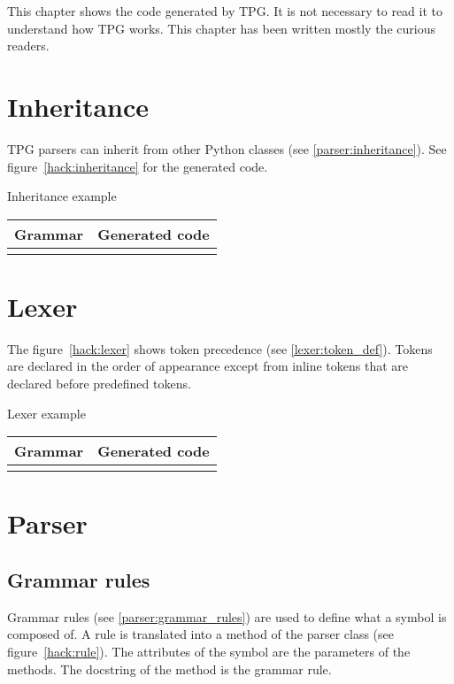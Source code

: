 
\newcommand{\hack}[3]
{
	\begin{tableau}
	\caption{#2} \label{#3}
	\begin{tabular}{| p{6cm} | p{8cm} | }
	\hline
		Grammar & Generated code \\
	\hline
	\hline
		{ \scriptsize \verbatimtabinput[4]{hack/#1.g} }
		&
		{ \scriptsize \verbatimtabinput[4]{hack/#1.py} }
		\\
	\hline
	\end{tabular}
	\end{tableau}
}

This chapter shows the code generated by TPG.
It is not necessary to read it to understand how TPG works.
This chapter has been written mostly the curious readers.

\section{Inheritance}

TPG parsers can inherit from other Python classes (see \ref{parser:inheritance}).
See figure~\ref{hack:inheritance} for the generated code.

\hack{baseclasses}{Inheritance example}{hack:inheritance}

\clearpage
\section{Lexer}

The figure~\ref{hack:lexer} shows token precedence (see \ref{lexer:token_def}).
Tokens are declared in the order of appearance except from inline tokens that are declared before predefined tokens.

\hack{lexer}{Lexer example}{hack:lexer}

\clearpage
\section{Parser}

\subsection{Grammar rules}

Grammar rules (see \ref{parser:grammar_rules}) are used to define what a symbol is composed of.
A rule is translated into a method of the parser class (see figure~\ref{hack:rule}).
The attributes of the symbol are the parameters of the methods.
The docstring of the method is the grammar rule.


